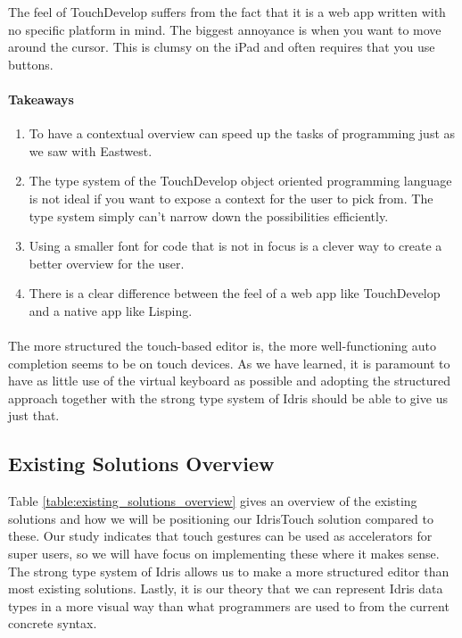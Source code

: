 The feel of TouchDevelop suffers from the fact that it is a web app written with no specific platform in mind. The biggest annoyance is when you want to move around the cursor. This is clumsy on the iPad and often requires that you use buttons.

\paragraph{Takeaways}
\begin{enumerate}
	\item To have a contextual overview can speed up the tasks of programming just as we saw with Eastwest.
	\item The type system of the TouchDevelop object oriented programming language is not ideal if you want to expose a context for the user to pick from. The type system simply can't narrow down the possibilities efficiently.
	\item Using a smaller font for code that is not in focus is a clever way to create a better overview for the user.
	\item There is a clear difference between the feel of a web app like TouchDevelop and a native app like Lisping.
\end{enumerate}

\paragraph{}

The more structured the touch-based editor is, the more well-functioning auto completion seems to be on touch devices. As we have learned, it is paramount to have as little use of the virtual keyboard as possible and adopting the structured approach together with the strong type system of Idris should be able to give us just that.

\subsection{Existing Solutions Overview}
Table \ref{table:existing_solutions_overview} gives an overview of the existing solutions and how we will be positioning our IdrisTouch solution compared to these. Our study indicates that touch gestures can be used as accelerators for super users, so we will have focus on implementing these where it makes sense. The strong type system of Idris allows us to make a more structured editor than most existing solutions. Lastly, it is our theory that we can represent Idris data types in a more visual way than what programmers are used to from the current concrete syntax.
	
